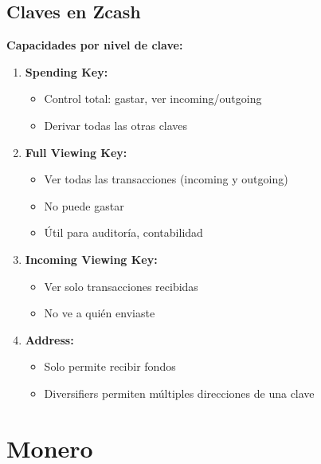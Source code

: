 \documentclass[11pt,a4paper,twoside]{book}
\begin{document}
\subsection{Claves en Zcash}

\begin{keyidea}
\textbf{Capacidades por nivel de clave:}

\begin{enumerate}
    \item \textbf{Spending Key:}
    \begin{itemize}
        \item Control total: gastar, ver incoming/outgoing
        \item Derivar todas las otras claves
    \end{itemize}
    
    \item \textbf{Full Viewing Key:}
    \begin{itemize}
        \item Ver todas las transacciones (incoming y outgoing)
        \item No puede gastar
        \item \'Util para auditor\'ia, contabilidad
    \end{itemize}
    
    \item \textbf{Incoming Viewing Key:}
    \begin{itemize}
        \item Ver solo transacciones recibidas
        \item No ve a qui\'en enviaste
    \end{itemize}
    
    \item \textbf{Address:}
    \begin{itemize}
        \item Solo permite recibir fondos
        \item Diversifiers permiten m\'ultiples direcciones de una clave
    \end{itemize}
\end{enumerate}
\end{keyidea}

\section{Monero}
\label{sec:monero}
\end{document}
